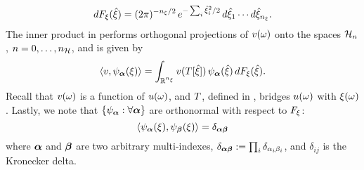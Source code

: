 \[
  \d\distribution_\z(\hat{\z}) = (2 \pi)^{-\nvars/2} \, e^{-\sum_i \hat{\z}_i^2 / 2} \, \d\hat{\z}_1 \cdots \d\hat{\z}_\nvars.
\]
The inner product in  performs orthogonal projections of $\w(\o)$ onto the spaces $\chaosSpace_n$, $n = 0, \dots, \ncorder$, and is given by
\[
  \innerProduct{\w, \polynomial_{\multiindex}(\z)} = \int_{\real^{\nvars}} \w(\oTransform[\hat{\z}]) \, \polynomial_{\multiindex}(\hat{\z}) \, \d\distribution_\z(\hat{\z}).
\]
Recall that $\w(\o)$ is a function of $\u(\o)$, and $\oTransform$, defined in , bridges $\u(\o)$ with $\z(\o)$.
Lastly, we note that $\{ \polynomial_{\multiindex}: \forall \multiindex \}$ are orthonormal with respect to $\distribution_\z$:
\[
  \innerProduct{\polynomial_{\multiindex}(\z), \polynomial_{\multiindex[\beta]}(\z)} = \delta_{\multiindex \multiindex[\beta]}
\]
where $\multiindex$ and $\multiindex[\beta]$ are two arbitrary multi-indexes, $\delta_{\multiindex \multiindex[\beta]} := \prod_i \delta_{\alpha_i \beta_i}$, and $\delta_{ij}$ is the Kronecker delta.
